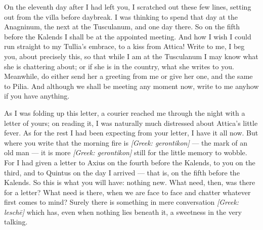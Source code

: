 

 On the eleventh day after I had left you, I scratched out these few lines, setting out from the villa before daybreak. I was thinking to spend that day at the Anagninum, the next at the Tusculanum, and one day there. So on the fifth before the Kalends I shall be at the appointed meeting. And how I wish I could run straight to my Tullia's embrace, to a kiss from Attica! Write to me, I beg you, about precisely this, so that while I am at the Tusculanum I may know what she is chattering about; or if she is in the country, what she writes to you. Meanwhile, do either send her a greeting from me or give her one, and the same to Pilia. And although we shall be meeting any moment now, write to me anyhow if you have anything.

 As I was folding up this letter, a courier reached me through the night with a letter of yours; on reading it, I was naturally much distressed about Attica's little fever. As for the rest I had been expecting from your letter, I have it all now. But where you write that the morning fire is \textit{[Greek: gerontikon]} --- the mark of an old man --- it is more \textit{[Greek: gerontikon]} still for the little memory to wobble. For I had given a letter to Axius on the fourth before the Kalends, to you on the third, and to Quintus on the day I arrived --- that is, on the fifth before the Kalends. So this is what you will have: nothing new. What need, then, was there for a letter? What need is there, when we are face to face and chatter whatever first comes to mind? Surely there is something in mere conversation \textit{[Greek: lesch\=e]} which has, even when nothing lies beneath it, a sweetness in the very talking.
